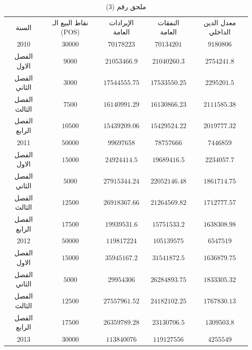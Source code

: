 \documentclass[10pt,a4paper]{report}
\begin{document}
	\begin{longtable}{|c|c|c|c|c|}
	\captionsetup{font=Large}
	\caption*{ملحق رقم (3)} \\
	\hline
	\rowcolor[HTML]{DAE8FC} 
	السنة        & نقاط البيع الـ (POS) & الإيرادات العامة & النفقات العامة & معدل الدين الداخلي \\ \hline
	2010         & $30000$              & $70178223$       & $70134201$     & $9180806$          \\ \hline
	الفصل الاول  & $9000$               & $21053466.9$     & $21040260.3$   & $2754241.8$        \\ \hline
	الفصل الثاني & $3000$               & $17544555.75$    & $17533550.25$  & $2295201.5$        \\ \hline
	الفصل الثالث & $7500$               & $16140991.29$    & $16130866.23$  & $2111585.38$       \\ \hline
	الفصل الرابع & $10500$              & $15439209.06$    & $15429524.22$  & $2019777.32$       \\ \hline
	2011         & $50000$              & $99697658$       & $78757666$     & $7446859$          \\ \hline
	الفصل الاول  & $15000$              & $24924414.5$     & $19689416.5$   & $2234057.7$        \\ \hline
	الفصل الثاني & $5000$               & $27915344.24$    & $22052146.48$  & $1861714.75$       \\ \hline
	الفصل الثالث & $12500$              & $26918367.66$    & $21264569.82$  & $1712777.57$       \\ \hline
	الفصل الرابع & $17500$              & $19939531.6$     & $15751533.2$   & $1638308.98$       \\ \hline
	2012         & $50000$              & $119817224$      & $105139575$    & $6547519$          \\ \hline
	الفصل الاول  & $15000$              & $35945167.2$     & $31541872.5$   & $1636879.75$       \\ \hline
	الفصل الثاني & $5000$               & $29954306$       & $26284893.75$  & $1833305.32$       \\ \hline
	الفصل الثالث & $12500$              & $27557961.52$    & $24182102.25$  & $1767830.13$       \\ \hline
	الفصل الرابع & $17500$              & $26359789.28$    & $23130706.5$   & $1309503.8$        \\ \hline
	2013         & $30000$              & $113840076$      & $119127556$    & $4255549$          \\ \hline

\end{longtable}
\end{document}
